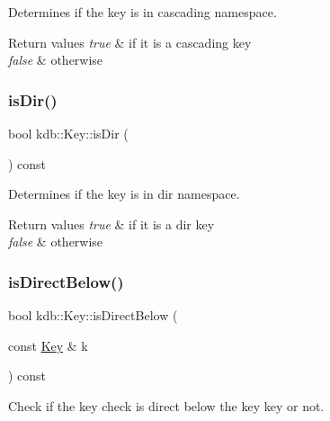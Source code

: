 Determines if the key is in cascading namespace. 


\begin{DoxyRetVals}{Return values}
{\em true} & if it is a cascading key \\
\hline
{\em false} & otherwise \\
\hline
\end{DoxyRetVals}
\mbox{\label{classkdb_1_1Key_a0c60f261479e4e21cc5e9acd76c0d26b}} 
\subsubsection{\texorpdfstring{is\+Dir()}{isDir()}}
{\footnotesize\ttfamily bool kdb\+::\+Key\+::is\+Dir (\begin{DoxyParamCaption}{ }\end{DoxyParamCaption}) const\hspace{0.3cm}{\ttfamily [inline]}}



Determines if the key is in dir namespace. 


\begin{DoxyRetVals}{Return values}
{\em true} & if it is a dir key \\
\hline
{\em false} & otherwise \\
\hline
\end{DoxyRetVals}
\mbox{\label{classkdb_1_1Key_a6b7ce3736c89225445b7cc49d0e62bbe}} 
\subsubsection{\texorpdfstring{is\+Direct\+Below()}{isDirectBelow()}}
{\footnotesize\ttfamily bool kdb\+::\+Key\+::is\+Direct\+Below (\begin{DoxyParamCaption}\item[{const \hyperlink{classkdb_1_1Key}{Key} \&}]{k }\end{DoxyParamCaption}) const\hspace{0.3cm}{\ttfamily [inline]}}



Check if the key check is direct below the key key or not. 


